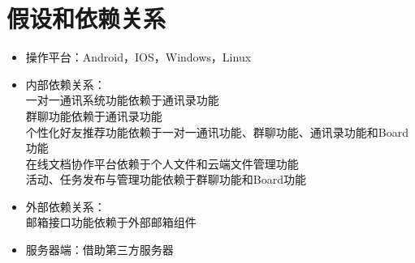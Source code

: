 \section{假设和依赖关系}
\begin{itemize}                                                      
	\item 操作平台：Android，IOS，Windows，Linux
	\item 内部依赖关系：\\
		一对一通讯系统功能依赖于通讯录功能\\
		群聊功能依赖于通讯录功能\\
		个性化好友推荐功能依赖于一对一通讯功能、群聊功能、通讯录功能和Board功能\\
		在线文档协作平台依赖于个人文件和云端文件管理功能\\
		活动、任务发布与管理功能依赖于群聊功能和Board功能
	\item 外部依赖关系：\\
		邮箱接口功能依赖于外部邮箱组件
	\item 服务器端：借助第三方服务器
\end{itemize}